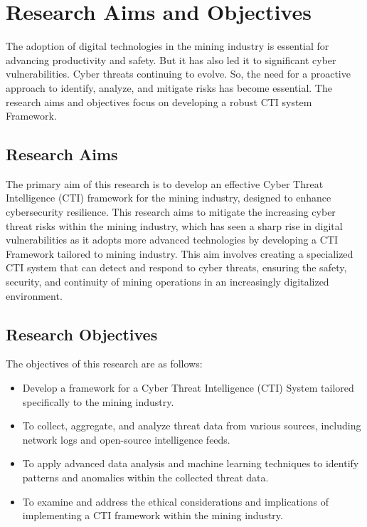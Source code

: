 \documentclass[a4paper,twoside,12pt]{report}
\begin{document}
\section{Research Aims and Objectives}
The adoption of digital technologies in the mining industry is essential for advancing productivity and safety. But it has also led it to significant cyber vulnerabilities. Cyber threats continuing to evolve. So, the need for a proactive approach to identify, analyze, and mitigate risks has become essential. The research aims and objectives focus on developing a robust CTI system Framework.\\
\subsection{Research Aims}
The primary aim of this research is to develop an effective Cyber Threat Intelligence (CTI) framework for the mining industry, designed to enhance cybersecurity resilience. This research aims to mitigate the increasing cyber threat risks within the mining industry, which has seen a sharp rise in digital vulnerabilities as it adopts more advanced technologies by developing a CTI Framework tailored to mining industry. This aim involves creating a specialized CTI system that can detect and respond to cyber threats, ensuring the safety, security, and continuity of mining operations in an increasingly digitalized environment.
\subsection{Research Objectives}

The objectives of this research are as follows:

\begin{itemize}
    \item Develop a framework for a Cyber Threat Intelligence (CTI) System tailored specifically to the mining industry.
    \item To collect, aggregate, and analyze threat data from various sources, including network logs and open-source intelligence feeds.
    \item To apply advanced data analysis and machine learning techniques to identify patterns and anomalies within the collected threat data.
    \item To examine and address the ethical considerations and implications of implementing a CTI framework within the mining industry.
\end{itemize}
\end{document}
